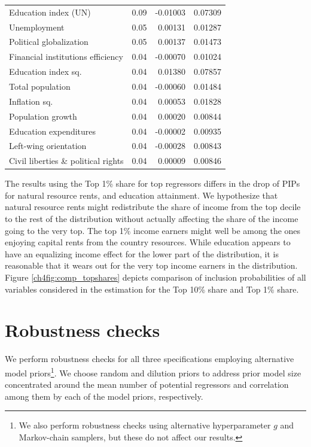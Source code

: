 \begin{refsection}
\begin{table}[ht!]
\begin{tabular}{lrrr}
  Education index (UN) & 0.09 & -0.01003 & 0.07309 \\ 
  Unemployment & 0.05 & 0.00131 & 0.01287 \\ 
  Political globalization & 0.05 & 0.00137 & 0.01473 \\ 
  Financial institutions efficiency & 0.04 & -0.00070 & 0.01024 \\ 
  Education index sq. & 0.04 & 0.01380 & 0.07857 \\ 
  Total population & 0.04 & -0.00060 & 0.01484 \\ 
  Inflation sq. & 0.04 & 0.00053 & 0.01828 \\ 
  Population growth & 0.04 & 0.00020 & 0.00844 \\
  Education expenditures & 0.04 & -0.00002 & 0.00935 \\ 
  Left-wing orientation & 0.04 & -0.00028 & 0.00843 \\ 
  Civil liberties \& political rights & 0.04 & 0.00009 & 0.00846 \\
    \bottomrule
  \end{tabular}
\end{table}

The results using the Top 1\% share for top regressors differs in the drop of \acp{PIP} for natural resource rents, and education attainment. We hypothesize that natural resource rents might redistribute the share of income from the top decile to the rest of the distribution without actually affecting the share of the income going to the very top. The top 1\% income earners might well be among the ones enjoying capital rents from the country resources. While education appears to have an equalizing income effect for the lower part of the distribution, it is reasonable that it wears out for the very top income earners in the distribution. Figure \ref{ch4fig:comp_topshares} depicts comparison of inclusion probabilities of all variables considered in the estimation for the Top 10\% share and Top 1\% share.

\section{Robustness checks}\label{ch4sec:robustness}
We perform robustness checks for all three specifications employing alternative model priors\footnote{We also perform robustness checks using alternative hyperparameter $g$ and Markov-chain samplers, but these do not affect our results.}. We choose random and dilution priors to address prior model size concentrated around the mean number of potential regressors and correlation among them by each of the model priors, respectively.


\end{refsection}
